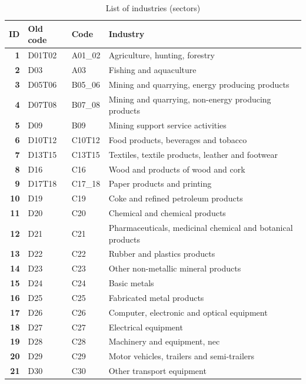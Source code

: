 \documentclass[preprint, 3p,
authoryear]{elsarticle} %
\begin{document}
\begin{table}[H]
\centering
\caption{\label{tab:industries}List of industries (sectors)}
\centering
\fontsize{7}{9}\selectfont
\begin{tabu} to 
\toprule
\textbf{ID} & \textbf{Old code} & \textbf{Code} & \textbf{Industry}\\
\midrule
\midrule
\textbf{1} & D01T02 & A01\_02 & Agriculture, hunting, forestry\\
\textbf{2} & D03 & A03 & Fishing and aquaculture\\
\textbf{3} & D05T06 & B05\_06 & Mining and quarrying, energy producing products\\
\textbf{4} & D07T08 & B07\_08 & Mining and quarrying, non-energy producing products\\
\textbf{5} & D09 & B09 & Mining support service activities\\
\textbf{6} & D10T12 & C10T12 & Food products, beverages and tobacco\\
\textbf{7} & D13T15 & C13T15 & Textiles, textile products, leather and footwear\\
\textbf{8} & D16 & C16 & Wood and products of wood and cork\\
\textbf{9} & D17T18 & C17\_18 & Paper products and printing\\
\textbf{10} & D19 & C19 & Coke and refined petroleum products\\
\textbf{11} & D20 & C20 & Chemical and chemical products\\
\textbf{12} & D21 & C21 & Pharmaceuticals, medicinal chemical and botanical products\\
\textbf{13} & D22 & C22 & Rubber and plastics products\\
\textbf{14} & D23 & C23 & Other non-metallic mineral products\\
\textbf{15} & D24 & C24 & Basic metals\\
\textbf{16} & D25 & C25 & Fabricated metal products\\
\textbf{17} & D26 & C26 & Computer, electronic and optical equipment\\
\textbf{18} & D27 & C27 & Electrical equipment\\
\textbf{19} & D28 & C28 & Machinery and equipment, nec\\
\textbf{20} & D29 & C29 & Motor vehicles, trailers and semi-trailers\\
\textbf{21} & D30 & C30 & Other transport equipment\\

\end{tabu}
\end{table}
\end{document}
